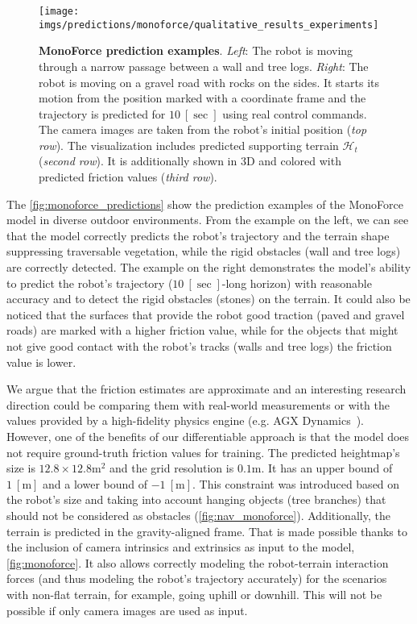 \begin{figure*}
    \centering
    \texttt{[image: imgs/predictions/monoforce/qualitative\_results\_experiments]}
    \caption{\textbf{MonoForce prediction examples}.
    \emph{Left}: The robot is moving through a narrow passage between a wall and tree logs.
    \emph{Right}: The robot is moving on a gravel road with rocks on the sides.
    It starts its motion from the position marked with a coordinate frame and the trajectory is predicted for $10~[\si{\sec}]$ using real control commands.
    The camera images are taken from the robot's initial position (\emph{top row}).
    The visualization includes predicted supporting terrain $\mathcal{H}_t$ (\emph{second row}).
    It is additionally shown in 3D and colored with predicted friction values (\emph{third row}).
    }
    \label{fig:monoforce_predictions}
\end{figure*}

The \autoref{fig:monoforce_predictions} show the prediction examples of the MonoForce model in diverse outdoor environments.
From the example on the left,
we can see that the model correctly predicts the robot's trajectory and the terrain shape suppressing traversable vegetation,
while the rigid obstacles (wall and tree logs) are correctly detected.
The example on the right demonstrates the model's ability to predict the robot's trajectory ($10~[\si{\sec}]$-long horizon)
with reasonable accuracy and to detect the rigid obstacles (stones) on the terrain.
It could also be noticed that the surfaces that provide the robot good traction (paved and gravel roads) are marked with a higher friction value,
while for the objects that might not give good contact with the robot's tracks (walls and tree logs) the friction value is lower.

We argue that the friction estimates are approximate and an interesting research direction could be
comparing them with real-world measurements or with the values provided by a high-fidelity physics engine (e.g. AGX Dynamics~\cite{Berglund2019agxTerrain}).
However, one of the benefits of our differentiable approach is that the model does not require ground-truth friction values for training.
The predicted heightmap's size is $12.8\times12.8\si{\meter}^2$ and the grid resolution is $0.1\si{\meter}$.
It has an upper bound of $1~[\si{\meter}]$ and a lower bound of $-1~[\si{\meter}]$.
This constraint was introduced based on the robot's size and taking into account hanging objects (tree branches)
that should not be considered as obstacles (\autoref{fig:nav_monoforce}).
Additionally, the terrain is predicted in the gravity-aligned frame.
That is made possible thanks to the inclusion of camera intrinsics and extrinsics as input to the model,
\autoref{fig:monoforce}.
It also allows correctly modeling the robot-terrain interaction forces (and thus modeling the robot's trajectory accurately)
for the scenarios with non-flat terrain, for example, going uphill or downhill.
This will not be possible if only camera images are used as input.